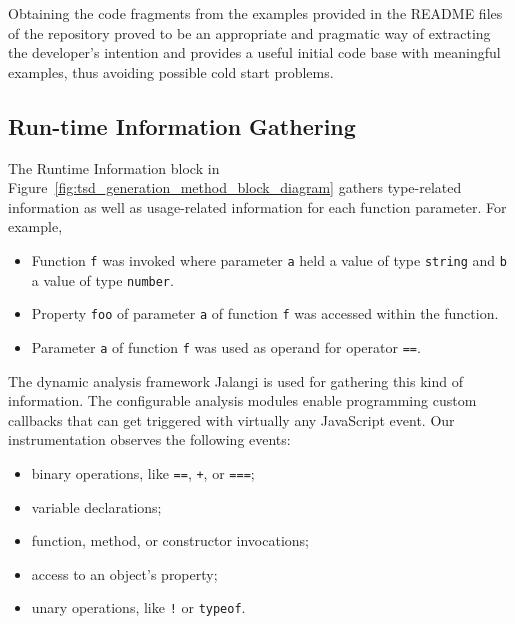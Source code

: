 \documentclass[english,cleveref,autoref,submission]{programming}
\newcommand{\figref}[1]{Figure~\ref{#1}}
\begin{document}
Obtaining the code fragments from the examples provided in the
README files of the repository proved to be an
appropriate and pragmatic way of extracting the developer's
intention and provides a useful initial code base with meaningful
examples, thus avoiding possible cold start problems.

\subsection{Run-time Information Gathering}
\label{sec:run-time-information}
The Runtime Information block in
\figref{fig:tsd_generation_method_block_diagram} gathers
type-related information as well as usage-related information for each function parameter.
For example,

\begin{itemize}
  \item Function \lstinline{f} was invoked where parameter
    \lstinline{a} held a value of type \lstinline{string} and
    \lstinline{b} a value of type \lstinline{number}. 
  \item Property \lstinline{foo} of parameter \lstinline{a} of
    function \lstinline{f} was accessed within the function. 
  \item Parameter \lstinline{a} of function \lstinline{f} was used as
    operand for operator \lstinline{==}. 
\end{itemize}

The dynamic analysis framework Jalangi is used for gathering this kind of
information. The configurable analysis modules enable
programming custom callbacks that can get triggered with virtually any
JavaScript event. Our instrumentation observes the following events: 
\begin{itemize}
  \item binary operations, like \lstinline{==}, \lstinline{+}, or
    \lstinline{===};
  \item variable declarations;
  \item function, method, or constructor invocations;
  \item access to an object's property;
  \item unary operations, like \lstinline{!} or \lstinline{typeof}.
\end{itemize}
\end{document}
